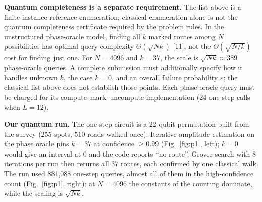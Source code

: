 \documentclass[10pt,a4paper]{article}
\begin{document}
\textbf{Quantum completeness is a separate requirement.} The list above is a
finite-instance reference enumeration; classical enumeration alone is not the
quantum completeness certificate required by the problem rules. In the
unstructured phase-oracle model, finding all $k$ marked routes among $N$
possibilities has optimal query complexity $\Theta(\sqrt{Nk})$ [11], not
the $\Theta(\sqrt{N/k})$ cost for finding just one. For $N=4096$ and
$k=37$, the scale is $\sqrt{Nk}\approx389$ phase-oracle queries. A complete
submission must additionally specify how it handles unknown $k$, the case
$k=0$, and an overall failure probability $\varepsilon$; the classical list
above does not establish those points. Each phase-oracle query must be charged
for its compute--mark--uncompute implementation (24 one-step calls when
$L=12$).

\textbf{Our quantum run.} The one-step circuit is a 22-qubit permutation built
from the survey (255 spots, 510 roads walked once). Iterative amplitude
estimation on the phase oracle pins $k=37$ at confidence $\ge0.99$
(Fig.~\ref{fig:p1}, left); $k=0$ would give an interval at $0$ and the code
reports ``no route''. Grover search with 8 iterations per run then returns
all 37 routes, each confirmed by one classical walk. The run used 881{,}088
one-step queries, almost all of them in the high-confidence count
(Fig.~\ref{fig:p1}, right): at $N=4096$ the constants of the counting
dominate, while the scaling is $\sqrt{Nk}$.
\end{document}
